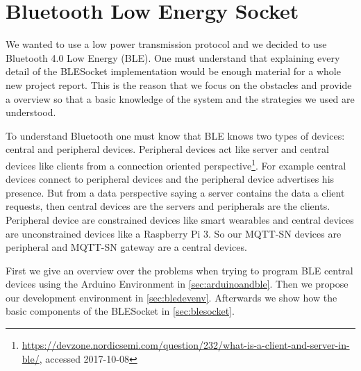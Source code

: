 \section{Bluetooth Low Energy Socket}\label{sec:BluetoothLowEnergySocket}
We wanted to use a low power transmission protocol and we decided to use Bluetooth 4.0 Low Energy (BLE).
One must understand that explaining every detail of the BLESocket implementation would be enough material for a whole new project report.
This is the reason that we focus on the obstacles and provide a overview so that a basic knowledge of the system and the strategies we used are understood.

To understand Bluetooth one must know that BLE knows two types of devices: central and peripheral devices.
Peripheral devices act like server and central devices like clients from a connection oriented perspective\footnote{\url{https://devzone.nordicsemi.com/question/232/what-is-a-client-and-server-in-ble/}, accessed 2017-10-08}.
For example central devices connect to peripheral devices and the peripheral device advertises his presence.
But from a data perspective saying a server contains the data a client requests, then central devices are the servers and peripherals are the clients.
Peripheral device are constrained devices like smart wearables and central devices are unconstrained devices like a Raspberry Pi 3.
So our MQTT-SN devices are peripheral and MQTT-SN gateway are a central devices.

First we give an overview over the problems when trying to program BLE central devices using the Arduino Environment in \autoref{sec:arduinoandble}.
Then we propose our development environment in \autoref{sec:bledevenv}.
Afterwards we show how the basic components of the BLESocket in \autoref{sec:blesocket}.

